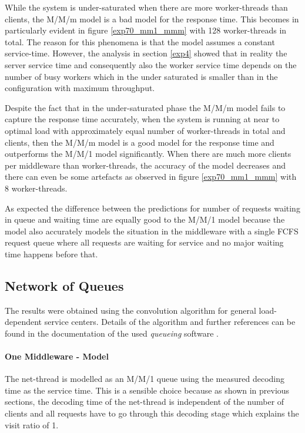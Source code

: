 \documentclass[report.tex]{subfiles}
\begin{document}
While the system is under-saturated when there are more worker-threads than clients, the M/M/m model is a bad model for the response time. This becomes in particularly evident in figure \ref{exp70_mm1_mmm} with 128 worker-threads in total. The reason for this phenomena is that the model assumes a constant service-time. However, the analysis in section \ref{exp4} showed that in reality the server service time and consequently also the worker service time depends on the number of busy workers which in the under saturated is smaller than in the configuration with maximum throughput.

Despite the fact that in the under-saturated phase the M/M/m model fails to capture the response time accurately, when the system is running at near to optimal load with approximately equal number of worker-threads in total and clients, then the M/M/m model is a good model for the response time and outperforms the M/M/1 model significantly.
When there are much more clients per middleware than worker-threads, the accuracy of the model decreases and there can even be some artefacts as observed in figure \ref{exp70_mm1_mmm} with 8 worker-threads.

As expected the difference between the predictions for number of requests waiting in queue and waiting time are equally good to the M/M/1 model because the model also accurately models the situation in the middleware with a single FCFS request queue where all requests are waiting for service and no major waiting time happens before that.

\subsection{Network of Queues}

The results were obtained using the convolution algorithm for general load-dependent service centers. Details of the algorithm and further references can be found in the documentation of the used \emph{queueing} software \cite{queueing}.


\paragraph{One Middleware - Model}

The net-thread is modelled as an M/M/1 queue using the measured decoding time as the service time.
This is a sensible choice because as shown in previous sections, the decoding time of the net-thread is independent of the number of clients and all requests have to go through this decoding stage which explains the visit ratio of 1.
\end{document}
